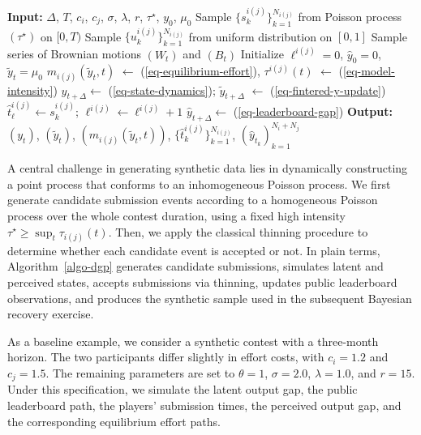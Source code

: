 \documentclass[mnsc]{informs3}
\begin{document}
\begin{algorithm}[!ht]
\caption{Synthetic Data Simulation}
\label{algo-dgp}
\begin{algorithmic}
\STATE \textbf{Input:}
	$\Delta$, $T$, $c_i$, $c_j$, $\sigma$, $\lambda$, $r$, $\tau^\star$, $y_0$, $\mu_0$
\STATE Sample $\{s_k^{i(j)}\}^{N_{i(j)}}_{k=1}$ from Poisson process $(\tau^\star)$ on $[0, T)$
\STATE Sample $\{u_k^{i(j)}\}^{N_{i(j)}}_{k=1}$ from uniform distribution on $[0, 1]$
\STATE Sample series of Brownian motions $(W_t)$ and $(B_t)$
\STATE Initialize $\ell^{i(j)}=0$, $\hat{y}_0 = 0$, $\tilde{y}_t=\mu_0$
    \STATE $m_{i(j)}(\tilde{y}_t, t)$  $\gets$ (\ref{eq-equilibrium-effort}), $\tau^{i(j)}(t)$ $\gets$ (\ref{eq-model-intensity})
    \hfill {}
    \STATE $y_{t+\Delta} \gets$ (\ref{eq-state-dynamics}); $\tilde{y}_{t+\Delta}$ $\gets$ (\ref{eq-fintered-y-update})
    \hfill {}
    \FOR{$s_{k}^{i(j)} \in [t, t+\Delta)$}
        	    \STATE $\hat{t}^{i(j)}_{\ell} \gets s_{k}^{i(j)}$; $\ell^{i(j)} \gets \ell^{i(j)}+1$
	    \hfill {}
	    \STATE $\hat{y}_{t+\Delta} \gets $ (\ref{eq-leaderboard-gap})
	    \hfill {}
        \ENDIF
    \ENDFOR
\ENDFOR
\STATE \textbf{Output:} $(y_t)$, $(\tilde{y}_t)$, $(m_{i(j)}(\tilde{y}_t, t))$, $\{\hat{t}_k^{i(j)}\}^{N_{i(j)}}_{k=1}$, $(\hat{y}_{t_k})_{k=1}^{N_i + N_j}$
\end{algorithmic}
\end{algorithm}

A central challenge in generating synthetic data lies in dynamically constructing a point process that conforms to an inhomogeneous Poisson process.
We first generate candidate submission events according to a homogeneous Poisson process over the whole contest duration, using a fixed high intensity $\tau^\star \ge \sup_t \tau_{i(j)}(t)$.
Then, we apply the classical thinning procedure \citep{lewis1979simulation} to determine whether each candidate event is accepted or not.
In plain terms, Algorithm~\ref{algo-dgp} generates candidate submissions, simulates latent and perceived states, accepts submissions via thinning, updates public leaderboard observations, and produces the synthetic sample used in the subsequent Bayesian recovery exercise.

As a baseline example, we consider a synthetic contest with a three-month horizon. The two participants differ slightly in effort costs, with $c_i = 1.2$ and $c_j = 1.5$. The remaining parameters are set to $\theta = 1$, $\sigma = 2.0$, $\lambda = 1.0$, and $r = 15$.
Under this specification, we simulate the latent output gap, the public leaderboard path, the players’ submission times, the perceived output gap, and the corresponding equilibrium effort paths.
\end{document}

